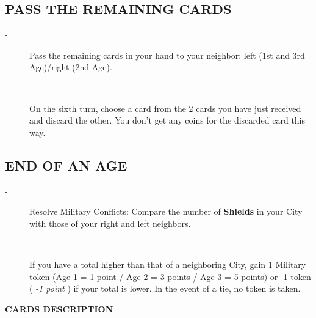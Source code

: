 \documentclass{scrartcl}%
\begin{document}
%
\subsection{ PASS THE REMAINING CARDS
}%
\label{subsec:PASSTHEREMAININGCARDS}%
\begin{description}%
\item[{-} ]%
%
 Pass the remaining cards in your hand to your neighbor: left (1st and 3rd Age)/right (2nd Age).
%
\item[{-} ]%
%
 On the sixth turn, choose a card from the 2 cards you have just received and discard the other. You don't get any coins for the discarded card this way.
%
\end{description}

%
\subsection{ END OF AN AGE
}%
\label{subsec:ENDOFANAGE}%
\begin{description}%
\item[{-} ]%
%
 Resolve Military Conflicts: Compare the number of %
\textbf{Shields}%
\textit{ }%
 in your City with those of your right and left neighbors.
%
\item[{-} ]%
%
 If you have a total higher than that of a neighboring City, gain 1 Military token (Age 1 = 1 point / Age 2 = 3 points / Age 3 = 5 points) or {-}1 token (%
\textit{{-}1 point}%
\textit{ }%
 ) if your total is lower. In the event of a tie, no token is taken.
%
\end{description}%
\textbf{CARDS DESCRIPTION}%
\end{document}
